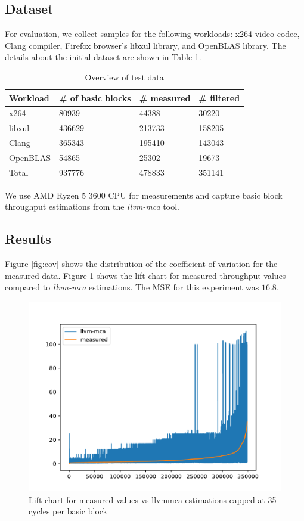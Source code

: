 \subsection{Dataset}
For evaluation, we collect samples for the following workloads: x264 video codec, Clang compiler, 
Firefox browser's libxul library, and OpenBLAS library. The details about the initial dataset are 
shown in Table \ref{tab:test_data}.

\begin{table}[htbp]
  \caption{Overview of test data}
  \label{tab:test_data}
  \begin{tabular}{llll}
  \hline
  Workload & \# of basic blocks & \# measured & \# filtered \\
  \hline
  x264     & 80939              & 44388       & 30220       \\
  libxul   & 436629             & 213733      & 158205      \\
  Clang    & 365343             & 195410      & 143043      \\
  OpenBLAS & 54865              & 25302       & 19673       \\
  Total    & 937776             & 478833      & 351141
  \end{tabular}
\end{table}

We use AMD Ryzen 5 3600 CPU for measurements and capture basic block throughput
estimations from the \textit{llvm-mca} tool.

\subsection{Results}
Figure \ref{fig:cov} shows the distribution of the coefficient of variation for
the measured data. Figure \ref{fig:lift_chart} shows the lift chart for measured
throughput values compared to \textit{llvm-mca} estimations. The MSE for this
experiment was $16.8$.

\begin{figure}[h]
  \caption{Lift chart for measured values vs llvm\-mca estimations capped at 35 cycles per basic block}
  \centering
  \label{fig:lift_chart}
  \includegraphics[width=0.9\columnwidth]{lift_chart_35_cycles}
\end{figure}

